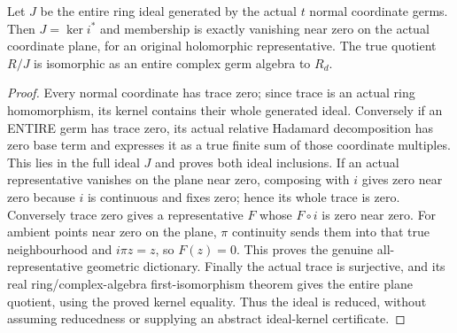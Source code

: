 \begin{theorem}
\label{hir:relative-normal-entire-plane-kernel}
\leanok
Let $J$ be the entire ring ideal generated by the actual $t$ normal coordinate
germs. Then $J=\ker i^*$ and membership is exactly vanishing near zero on the
actual coordinate plane, for an original holomorphic representative. The true
quotient $R/J$ is isomorphic as an entire complex germ algebra to $R_d$.
\end{theorem}
\begin{proof}
Every normal coordinate has trace zero; since trace is an actual ring
homomorphism, its kernel contains their whole generated ideal. Conversely if
an ENTIRE germ has trace zero, its actual relative Hadamard decomposition has
zero base term and expresses it as a true finite sum of those coordinate
multiples. This lies in the full ideal $J$ and proves both ideal inclusions.
If an actual representative vanishes on the plane near zero, composing with
$i$ gives zero near zero because $i$ is continuous and fixes zero; hence its
whole trace is zero. Conversely trace zero gives a representative $F$ whose
$F\circ i$ is zero near zero. For ambient points near zero on the plane,
$\pi$ continuity sends them into that true neighbourhood and $i\pi z=z$, so
$F(z)=0$. This proves the genuine all-representative geometric dictionary.
Finally the actual trace is surjective, and its real ring/complex-algebra
first-isomorphism theorem gives the entire plane quotient, using the proved
kernel equality. Thus the ideal is reduced, without assuming reducedness or
supplying an abstract ideal-kernel certificate.
\end{proof}

